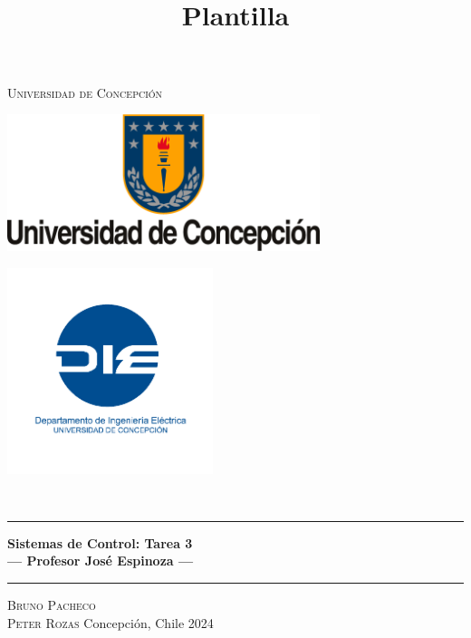 \title{{\Large \\ Plantilla \\[0.1 cm]}}

\pagestyle{fancy}
\fancyhf{}
\lhead{\thetitle}
\cfoot{\thepage}

\begin{titlepage}
    \newcommand{\drop}{0.1\textheight}
    \newcommand{\halfdrop}{0.05\textheight}
    \vspace*{\drop}
    \begin{center}
    {\LARGE\textsc{Universidad de Concepción}}\\[\drop]
    \begin{minipage}{0.47\linewidth}
        \centering
        {\includegraphics[height=4cm]{extras/logo_udec.png}}
    \end{minipage}
    \begin{minipage}{0.47\linewidth}  %
        \centering
        {\includegraphics[height=6cm]{extras/logo_die.png}}
    \end{minipage}\\[\halfdrop]
    \rule{\textwidth}{1pt}\par
    \vspace{0.5\baselineskip}
    {\huge\bfseries Sistemas de Control: Tarea 3\\
    \large --- Profesor José Espinoza  ---}\\[0.5\baselineskip]
    \rule{\textwidth}{1pt}\par
    \vfill
    {\Large\textsc{Bruno Pacheco \\ Peter Rozas}}
    \vfill
    Concepción, Chile
    \vfill
    {\large 2024}
    \end{center}
\end{titlepage}

\fancyfoot[C]{\thepage}  %
\renewcommand{\footrulewidth}{0.4pt}
